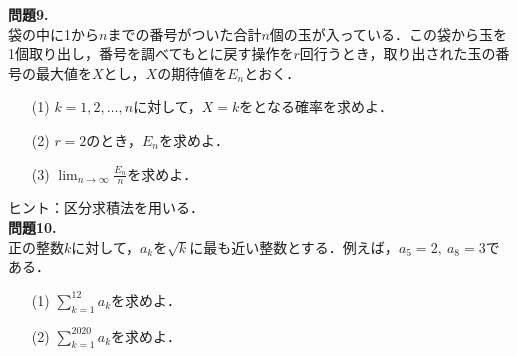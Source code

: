 \documentclass[a4paper]{ltjsarticle}
\begin{document}
\noindent \textbf{問題9.}\\
袋の中に1から$n$までの番号がついた合計$n$個の玉が入っている．この袋から玉を1個取り出し，番号を調べてもとに戻す操作を$r$回行うとき，取り出された玉の番号の最大値を$X$とし，$X$の期待値を$E_n$とおく．
\begin{itemize}
    \item [(1)]$k=1,2,\ldots,n$に対して，$X=k$をとなる確率を求めよ．
    \item [(2)]$r=2$のとき，$E_n$を求めよ．
    \item [(3)]$\displaystyle{\lim_{n\to\infty}\frac{E_n}{n}}$を求めよ．
\end{itemize}
ヒント：区分求積法を用いる．\\


\noindent \textbf{問題10.}\\
正の整数$k$に対して，$a_k$を$\sqrt{k}$に最も近い整数とする．例えば，$a_5=2,~a_8=3$である．
\begin{itemize}
    \item [(1)]$\displaystyle{\sum_{k=1}^{12}a_k}$を求めよ．
    \item [(2)]$\displaystyle{\sum_{k=1}^{2020}a_k}$を求めよ．
\end{itemize}
\end{document}
